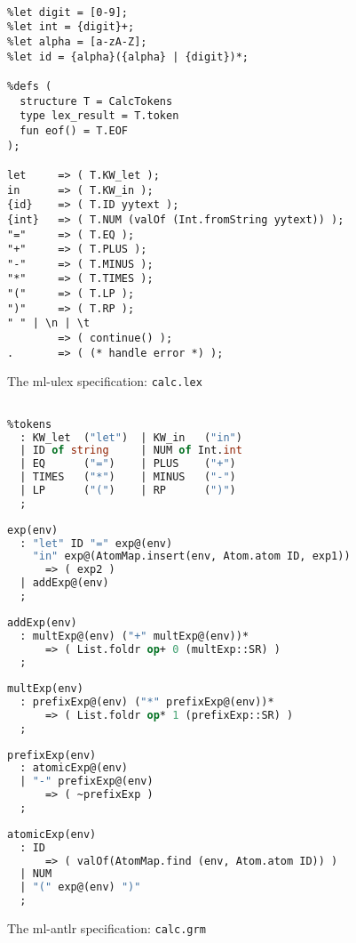 \begin{figure}

\begin{lstlisting}[language=MLULex]
%name CalcLexer;

%let digit = [0-9];
%let int = {digit}+;
%let alpha = [a-zA-Z];
%let id = {alpha}({alpha} | {digit})*;

%defs (
  structure T = CalcTokens
  type lex_result = T.token
  fun eof() = T.EOF
);

let     => ( T.KW_let );
in      => ( T.KW_in );
{id}    => ( T.ID yytext );
{int}   => ( T.NUM (valOf (Int.fromString yytext)) );
"="     => ( T.EQ );
"+"     => ( T.PLUS );
"-"     => ( T.MINUS );
"*"     => ( T.TIMES );
"("     => ( T.LP );
")"     => ( T.RP );
" " | \n | \t
        => ( continue() );
.       => ( (* handle error *) );
\end{lstlisting}
\caption{The ml-ulex specification: \texttt{calc.lex}}
\label{fig:calc-lex}
\end{figure}%

\begin{figure}[p]
\begin{lstlisting}[language=SML]
%name Calc;

%tokens
  : KW_let  ("let")  | KW_in   ("in")
  | ID of string     | NUM of Int.int
  | EQ      ("=")    | PLUS    ("+")
  | TIMES   ("*")    | MINUS   ("-")
  | LP      ("(")    | RP      (")")
  ;
  
exp(env)
  : "let" ID "=" exp@(env) 
    "in" exp@(AtomMap.insert(env, Atom.atom ID, exp1))
      => ( exp2 )
  | addExp@(env)
  ;
  
addExp(env)
  : multExp@(env) ("+" multExp@(env))*
      => ( List.foldr op+ 0 (multExp::SR) )
  ;
  
multExp(env)
  : prefixExp@(env) ("*" prefixExp@(env))*
      => ( List.foldr op* 1 (prefixExp::SR) )
  ;
  
prefixExp(env)
  : atomicExp@(env)
  | "-" prefixExp@(env)
      => ( ~prefixExp )
  ;
  
atomicExp(env)
  : ID  
      => ( valOf(AtomMap.find (env, Atom.atom ID)) )
  | NUM
  | "(" exp@(env) ")"
  ;
\end{lstlisting}
\caption{The ml-antlr specification: \texttt{calc.grm}}
\label{fig:calc-grm}
\end{figure}%


